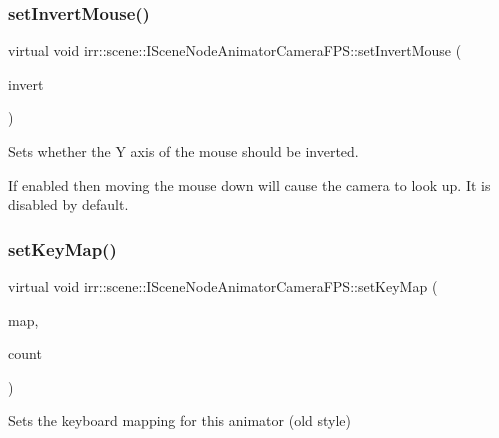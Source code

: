 \subsubsection{\texorpdfstring{set\+Invert\+Mouse()}{setInvertMouse()}\hspace{0.1cm}{\footnotesize\ttfamily [2/2]}}
{\footnotesize\ttfamily virtual void irr\+::scene\+::\+I\+Scene\+Node\+Animator\+Camera\+F\+P\+S\+::set\+Invert\+Mouse (\begin{DoxyParamCaption}\item[{bool}]{invert }\end{DoxyParamCaption})\hspace{0.3cm}{\ttfamily [pure virtual]}}



Sets whether the Y axis of the mouse should be inverted. 

If enabled then moving the mouse down will cause the camera to look up. It is disabled by default. \mbox{\label{classirr_1_1scene_1_1ISceneNodeAnimatorCameraFPS_a449aba2c0047f895e417a872505c02ce}} 
\subsubsection{\texorpdfstring{set\+Key\+Map()}{setKeyMap()}\hspace{0.1cm}{\footnotesize\ttfamily [1/4]}}
{\footnotesize\ttfamily virtual void irr\+::scene\+::\+I\+Scene\+Node\+Animator\+Camera\+F\+P\+S\+::set\+Key\+Map (\begin{DoxyParamCaption}\item[{\hyperlink{structirr_1_1SKeyMap}{S\+Key\+Map} $\ast$}]{map,  }\item[{\hyperlink{namespaceirr_a0416a53257075833e7002efd0a18e804}{u32}}]{count }\end{DoxyParamCaption})\hspace{0.3cm}{\ttfamily [pure virtual]}}



Sets the keyboard mapping for this animator (old style) 



